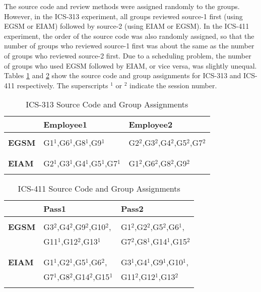 The source code and review methods were assigned
randomly to the groups. However, in the ICS-313 experiment, all groups reviewed
source-1 first (using EGSM or EIAM) followed by source-2 (using EIAM
or EGSM). In the ICS-411 experiment, the order of the source code was
also randomly assigned, so that the number of groups who reviewed source-1
first was about the same as the number of groups who reviewed
source-2 first.
Due to a scheduling problem, the number of groups who
used EGSM followed by EIAM, or vice versa, was slightly unequal.
Tables \ref{group-assignments-313} and \ref{group-assignments-411}
show the source code and group  
assignments for ICS-313 and ICS-411 respectively. The superscripts $^1$
or $^2$ indicate the session number.


\begin{table}[htb]
  \caption{ICS-313 Source Code and Group Assignments}
  \begin{center}
    \begin{tabular} {|l|l|l|}
      \hline
      & {\bf Employee1} & {\bf Employee2}\\
      \hline
      & & \\
      {\bf EGSM} & G1$^1$,G6$^1$,G8$^1$,G9$^1$ & G2$^2$,G3$^2$,G4$^2$,G5$^2$,G7$^2$ \\
      & & \\
      \hline
      & & \\
      {\bf EIAM} & G2$^1$,G3$^1$,G4$^1$,G5$^1$,G7$^1$ & G1$^2$,G6$^2$,G8$^2$,G9$^2$ \\
      & &  \\
      \hline
     \end{tabular}
  \end{center}
  \label{group-assignments-313}
\end{table}


\begin{table}[htb]
  \caption{ICS-411 Source Code and Group Assignments}
  \begin{center}
    \begin{tabular} {|l|l|l|}
      \hline
      & {\bf Pass1} & {\bf Pass2}\\
      \hline
      & & \\
      {\bf EGSM} & G3$^2$,G4$^2$,G9$^2$,G10$^2$, & G1$^2$,G2$^2$,G5$^2$,G6$^1$, \\
                 & G11$^1$,G12$^2$,G13$^1$ & G7$^2$,G8$^1$,G14$^1$,G15$^2$\\
      & & \\
      \hline
      & & \\
      {\bf EIAM} & G1$^1$,G2$^1$,G5$^1$,G6$^2$, & G3$^1$,G4$^1$,G9$^1$,G10$^1$, \\
                 & G7$^1$,G8$^2$,G14$^2$,G15$^1$ & G11$^2$,G12$^1$,G13$^2$\\
      & &  \\
      \hline
     \end{tabular}
  \end{center}
  \label{group-assignments-411}
\end{table}


